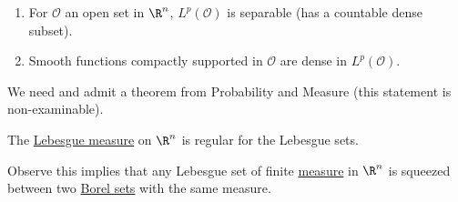 \documentclass{article}
\begin{document}
\begin{thm}[Density-separability of $L^p(\R^n)$, $p \in [1, +\infty)$]
    \leavevmode
    \begin{enumerate}[label=(\arabic*)]
        \item For $\mathcal{O}$ an open set in $\R^n$, $L^p(\mathcal{O})$ is separable (has a countable dense subset).
        \item Smooth functions compactly supported in $\mathcal{O}$ are dense in $L^p(\mathcal{O})$.
    \end{enumerate}
\end{thm}

We need and admit a theorem from Probability and Measure (this statement is non-examinable).
\begin{thm}
    The \hyperlink{def:lebMeas}{Lebesgue measure} on $\R^n$ is regular for the Lebesgue sets.
\end{thm}
Observe this implies that any Lebesgue set of finite \hyperlink{def:measure}{measure} in $\R^n$ is squeezed between two \hyperlink{def:borelSet}{Borel sets} with the same measure.
\end{document}
